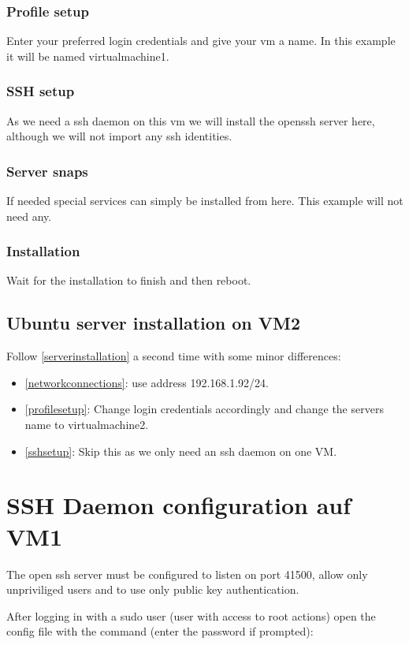 \documentclass[10pt,a4paper]{article}
\begin{document}
\subsubsection{Profile setup}
\label{profilesetup}
Enter your preferred login credentials and give your vm a name. In this example it will be named virtualmachine1.

\subsubsection{SSH setup}
\label{sshsetup}
As we need a ssh daemon on this vm we will install the openssh server here, although we will not import any ssh identities.

\subsubsection{Server snaps}
If needed special services can simply be installed from here. This example will not need any.

\subsubsection{Installation}
Wait for the installation to finish and then reboot.

\subsection{Ubuntu server installation on VM2}
Follow \autoref{serverinstallation} a second time with some minor differences:
\begin{itemize}
\item \autoref{networkconnections}: use address 192.168.1.92/24.
\item \autoref{profilesetup}: Change login credentials accordingly and change the servers name to virtualmachine2.
\item \autoref{sshsetup}: Skip this as we only need an ssh daemon on one VM.
\end{itemize}

\newpage
\section{SSH Daemon configuration auf VM1}
The open ssh server must be configured to listen on port 41500, allow only unpriviliged users and to use only public key authentication.

After logging in with a sudo user (user with access to root actions) open the config file with the command (enter the password if prompted):
\end{document}
